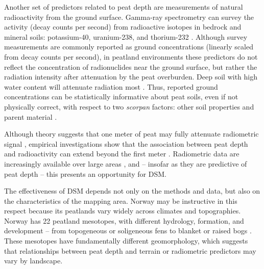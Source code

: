 \documentclass[soil, manuscript]{copernicus}
\begin{document}
Another set of predictors related to peat depth are measurements of natural radioactivity from the ground surface.
Gamma-ray spectrometry can survey the activity (decay counts per second) from radioactive isotopes in bedrock and mineral soils: potassium-40, uranium-238, and thorium-232 \citep{beamishEnvironmentalRadioactivityUK2014, reinhardtGammaraySpectrometryVersatile2019}.
Although survey measurements are commonly reported as ground concentrations (linearly scaled from decay counts per second), in peatland environments these predictors do not reflect the concentration of radionuclides near the ground surface, but rather the radiation intensity after attenuation by the peat overburden.
Deep soil with high water content will attenuate radiation most \citep{beamishGammaRayAttenuation2013, reinhardtGammaraySpectrometryVersatile2019}.
Thus, reported ground concentrations can be statistically informative about peat soils, even if not physically correct, with respect to two \emph{scorpan} factors: other soil properties and parent material \citep{mcbratneyDigitalSoilMapping2003}.

Although theory suggests that one meter of peat may fully attenuate radiometric signal \citep{beamishGammaRayAttenuation2013, reinhardtGammaraySpectrometryVersatile2019}, empirical investigations show that the association between peat depth and radioactivity can extend beyond the first meter \citep{keaneySpatialStatisticsEstimate2013, gatisMappingUplandPeat2019, kogantiMappingPeatDepth2023}.
Radiometric data are increasingly available over large areas \citep{minasnyDigitalMappingPeatlands2019, baranwalAirborneGeophysicalSurveys2020}, and -- insofar as they are predictive of peat depth -- this presents an opportunity for DSM.

The effectiveness of DSM depends not only on the methods and data, but also on the characteristics of the mapping area.
Norway may be instructive in this respect because its peatlands vary widely across climates and topographies.
Norway has 22 peatland mesotopes, with different hydrology, formation, and development -- from topogeneous or soligeneous fens to blanket or raised bogs \citep{joostenWiseUseMires2002, lyngstadBeskrivelserAvTorvmassivenheter2023}.
These mesotopes have fundamentally different geomorphology, which suggests that relationships between peat depth and terrain or radiometric predictors may vary by landscape.
\end{document}
